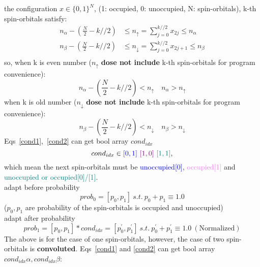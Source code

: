 the configuration $x \in \{0, 1\}^{N}$, (1: occupied, 0: unoccupied, N: spin-orbitals),
k-th spin-orbitals satisfy:
\begin{equation}
    \begin{split}
        n_{\alpha} - \left(\frac{N}{2} - k//2\right) &
            \leq n_{\uparrow} = \sum_{j=0}^{k//2}x_{2j} \leq n_{\alpha} \\
        n_{\beta} - \left(\frac{N}{2} - k//2\right) &
            \leq n_{\downarrow} = \sum_{j=0}^{k//2}x_{2j+1} \leq n_{\beta} \\
    \end{split}
\end{equation}
so, when k is even number ($n_{\uparrow}$ \textbf{dose not include} k-th spin-orbitals for program convenience):
\begin{equation}
    n_{\alpha} - \left(\frac{N}{2} - k//2\right) < n_{\uparrow} \quad n_{\alpha} > n_{\uparrow} \label{cond1}
\end{equation}
when k is old number  ($n_{\downarrow}$ \textbf{dose not include} k-th spin-orbitals for program convenience):
\begin{equation}
    n_{\beta} - \left(\frac{N}{2} - k//2\right) < n_{\downarrow} \quad n_{\beta} > n_{\downarrow} \label{cond2}
\end{equation}
Eqs\ \ref{cond1},\ \ref{cond2} can get bool array $cond_{idx}$
\begin{equation}
 cond_{idx} \in \textcolor{blue}{[0, 1]} \ \textcolor{violet}{[1, 0]}\ \textcolor{teal}{[1, 1]},
\end{equation}
which mean the next spin-orbitals must be \textcolor{blue}{unoccupied[0]},
\textcolor{violet}{occupied[1]} and \textcolor{teal}{unoccupied or occupied[0]/[1]}.\\
adapt before probability 
\begin{equation}
    prob_0 = [p_0, p_1] \ s.t.\ p_0 + p_1 \equiv 1.0
\end{equation}
($p_0, p_1$ are probability of the spin-orbitals is occupied and unoccupied)\\
adapt after probability
\begin{equation}
prob_1 =[p_0, p_1] * cond_{idx} = [p_0^{\prime}, p_1^{\prime}] 
    \ s.t.\ p_0^{\prime} + p_1^{\prime} \equiv 1.0 \ (\textrm{Normalized})
\end{equation}
\indent The above is for the case of one spin-orbitals, however, 
the case of two spin-orbitals is \textbf{convoluted}.
Eqs\ \ref{cond1} and \ref{cond2} can get bool array $cond_{idx}\alpha, cond_{idx}\beta$:
